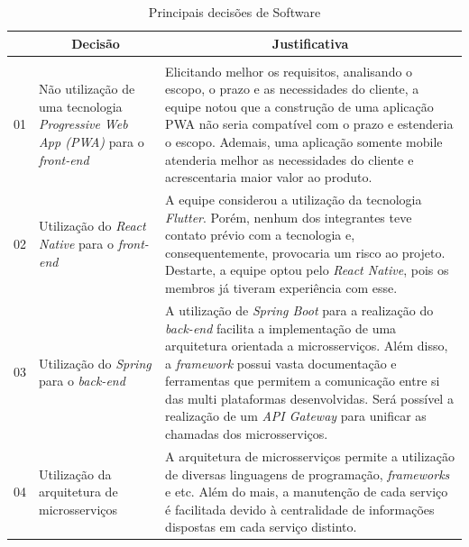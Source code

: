 \begin{apendicesenv}
\vspace{1cm}

\begin{table}[H]
    \centering
    \caption{Principais decisões de Software}
    \label{tab:decisoes_software}
    \begin{adjustbox}{max width = 1\textwidth}
        \begin{tabular}{|c|p{5cm}|p{10cm}|}
            \hline
            \rowcolor[HTML]{A8DADC}
            \multicolumn{1}{|c}{\textbf{\#}} &
            \multicolumn{1}{|c}{\textbf{Decisão}} & \multicolumn{1}{|c|}{\textbf{Justificativa}} \\ 
            \hline
            \rowcolor[HTML]{1D3557}\multicolumn{3}{|c|}{\textbf{\color{white}Ponto de Controle 1}} \\ \hline
            01 & Não utilização de uma tecnologia \textit{Progressive Web App (PWA)} para o \textit{front-end} & Elicitando melhor os requisitos, analisando o escopo, o prazo e as necessidades do cliente, a equipe notou que a construção de uma aplicação PWA não seria compatível com o prazo e estenderia o escopo. Ademais, uma aplicação somente mobile atenderia melhor as necessidades do cliente e acrescentaria maior valor ao produto.  \\ 
            \hline
            02 & Utilização do \textit{React Native} para o \textit{front-end} & A equipe considerou a utilização da tecnologia \textit{Flutter}. Porém, nenhum dos integrantes teve contato prévio com a tecnologia e, consequentemente, provocaria um risco ao projeto. Destarte, a equipe optou pelo \textit{React Native}, pois os membros já tiveram experiência com esse. \\ 
            \hline
            03 & Utilização do \textit{Spring} para o \textit{back-end} & A utilização de \textit{Spring Boot} para a realização do \emph{back-end} facilita a implementação de uma arquitetura orientada a microsserviços. Além disso, a \textit{framework} possui vasta documentação e ferramentas que permitem a comunicação entre si das multi plataformas desenvolvidas. Será possível a realização de um \textit{API Gateway} para unificar as chamadas dos microsserviços. \\ 
            \hline
            04 & Utilização da arquitetura de microsserviços & A arquitetura de microsserviços permite a utilização de diversas linguagens de programação, \textit{frameworks} e etc. Além do mais, a manutenção de cada serviço é facilitada devido à centralidade de informações dispostas em cada serviço distinto.\\ 

\end{tabular}
\end{adjustbox}
\end{table}
\end{apendicesenv}
